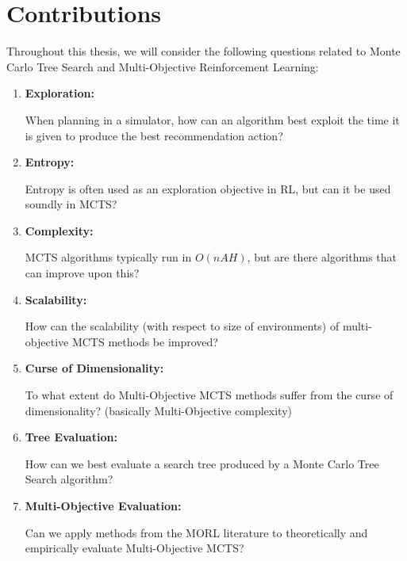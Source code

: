 \section{Contributions}
\label{sec:1-2-contributions}



    Throughout this thesis, we will consider the following questions related to Monte Carlo Tree Search and Multi-Objective Reinforcement Learning:
    \begin{enumerate}[start=1, label={\textbf{Q\arabic* -}}]
        \item \hypertarget{q1}{\textbf{Exploration:}} When planning in a simulator, how can an algorithm best exploit the time it is given to produce the best recommendation action?
        \item \hypertarget{q2}{\textbf{Entropy:}} Entropy is often used as an exploration objective in RL, but can it be used soundly in MCTS?
        \item \hypertarget{q3}{\textbf{Complexity:}} MCTS algorithms typically run in $O(nAH)$, but are there algorithms that can improve upon this?
        \item \hypertarget{q4}{\textbf{Scalability:}} How can the scalability (with respect to size of environments) of multi-objective MCTS methods be improved?
        \item \hypertarget{q5}{\textbf{Curse of Dimensionality:}} To what extent do Multi-Objective MCTS methods suffer from the curse of dimensionality? (basically Multi-Objective complexity)
        \item \hypertarget{q6}{\textbf{Tree Evaluation:}} How can we best evaluate a search tree produced by a Monte Carlo Tree Search algorithm? 
        \item \hypertarget{q7}{\textbf{Multi-Objective Evaluation:}} Can we apply methods from the MORL literature to theoretically and empirically evaluate Multi-Objective MCTS?
    \end{enumerate}

